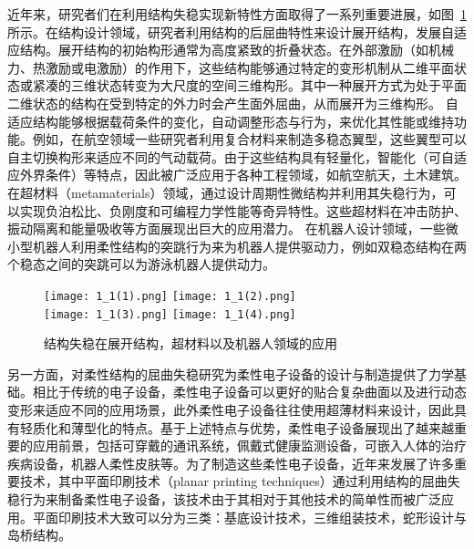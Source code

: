 近年来，研究者们在利用结构失稳实现新特性方面取得了一系列重要进展，如图~\ref{fig:1}所示。在结构设计领域，研究者利用结构的后屈曲特性来设计展开结构，发展自适应结构。展开结构的初始构形通常为高度紧致的折叠状态。在外部激励（如机械力、热激励或电激励）的作用下，这些结构能够通过特定的变形机制从二维平面状态或紧凑的三维状态转变为大尺度的空间三维构形。其中一种展开方式为处于平面二维状态的结构在受到特定的外力时会产生面外屈曲，从而展开为三维构形\cite{panetta2019x,chen2021bistable,liu2023deployable,10.1145/3386569.3392490,yu2023continuous}。
自适应结构能够根据载荷条件的变化，自动调整形态与行为，来优化其性能或维持功能。例如，在航空领域一些研究者利用复合材料来制造多稳态翼型，这些翼型可以自主切换构形来适应不同的气动载荷\cite{arrieta2013modelling,DIACONU2008689}。由于这些结构具有轻量化，智能化（可自适应外界条件）等特点，因此被广泛应用于各种工程领域，如航空航天\cite{zhang2021deployable}，土木建筑\cite{GEIGER20208363}。
在超材料（metamaterials）领域，通过设计周期性微结构并利用其失稳行为，可以实现负泊松比、负刚度和可编程力学性能等奇异特性\cite{cui2014coding}。这些超材料在冲击防护、振动隔离和能量吸收等方面展现出巨大的应用潜力。
在机器人设计领域，一些微小型机器人利用柔性结构的突跳行为来为机器人提供驱动力，例如双稳态结构在两个稳态之间的突跳可以为游泳机器人提供动力\cite{chen2018harnessing,chi2022snapping}。
\begin{figure}
	\centering
	{\texttt{[image: 1\_1(1).png]}}
	{\texttt{[image: 1\_1(2).png]}}\\
	{\texttt{[image: 1\_1(3).png]}}
	{\texttt{[image: 1\_1(4).png]}}
	\caption{结构失稳在展开结构，超材料以及机器人领域的应用}
	\label{fig:1}
\end{figure}

另一方面，对柔性结构的屈曲失稳研究为柔性电子设备的设计与制造提供了力学基础。相比于传统的电子设备，柔性电子设备可以更好的贴合复杂曲面以及进行动态变形来适应不同的应用场景，此外柔性电子设备往往使用超薄材料来设计，因此具有轻质化和薄型化的特点。基于上述特点与优势，柔性电子设备展现出了越来越重要的应用前景，包括可穿戴的通讯系统，佩戴式健康监测设备，可嵌入人体的治疗疾病设备，机器人柔性皮肤\cite{rogers2010materials}等。为了制造这些柔性电子设备，近年来发展了许多重要技术，其中平面印刷技术\cite{yin2020structural}（planar printing techniques）通过利用结构的屈曲失稳行为来制备柔性电子设备，该技术由于其相对于其他技术的简单性而被广泛应用。平面印刷技术大致可以分为三类：基底设计技术，三维组装技术，蛇形设计与岛桥结构。

